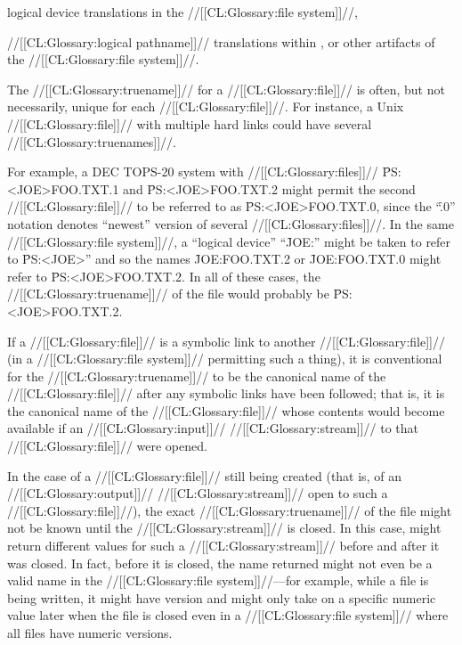      logical device translations in the //[[CL:Glossary:file system]]//,

     //[[CL:Glossary:logical pathname]]// translations within \clisp,
  or other artifacts of the //[[CL:Glossary:file system]]//.

The //[[CL:Glossary:truename]]// for a //[[CL:Glossary:file]]// is often, but not necessarily, unique for each //[[CL:Glossary:file]]//.  For instance, a Unix //[[CL:Glossary:file]]// with multiple hard links  could have several //[[CL:Glossary:truenames]]//.


For example, a DEC TOPS-20 system with //[[CL:Glossary:files]]// \f{PS:<JOE>FOO.TXT.1}  and \f{PS:<JOE>FOO.TXT.2} might permit the second //[[CL:Glossary:file]]// to be referred to as \f{PS:<JOE>FOO.TXT.0}, since the ``\f{.0}'' notation denotes ``newest'' version of several //[[CL:Glossary:files]]//. In the same //[[CL:Glossary:file system]]//, a ``logical device'' ``\f{JOE:}'' might be  taken to refer to \f{PS:<JOE>}'' and so the names \f{JOE:FOO.TXT.2} or \f{JOE:FOO.TXT.0} might refer to \f{PS:<JOE>FOO.TXT.2}. In all of these cases, the //[[CL:Glossary:truename]]// of the file would probably be \f{PS:<JOE>FOO.TXT.2}.

If a //[[CL:Glossary:file]]// is a symbolic link to another //[[CL:Glossary:file]]// (in a //[[CL:Glossary:file system]]// permitting such a thing), it is conventional for the //[[CL:Glossary:truename]]// to be the canonical name of the //[[CL:Glossary:file]]// after any symbolic links have been followed; that is, it is the canonical name of the //[[CL:Glossary:file]]// whose contents would become available if an //[[CL:Glossary:input]]// //[[CL:Glossary:stream]]// to that //[[CL:Glossary:file]]// were  opened.

In the case of a //[[CL:Glossary:file]]// still being created (that is, of an //[[CL:Glossary:output]]// //[[CL:Glossary:stream]]// open to such a //[[CL:Glossary:file]]//), the exact //[[CL:Glossary:truename]]// of the file might not be known until the //[[CL:Glossary:stream]]// is closed.  In this case,   might return different values for such a //[[CL:Glossary:stream]]// before and after it was closed.  In fact, before it is closed, the name returned might not even be a valid name in the //[[CL:Glossary:file system]]//---for example, while a file is being written, it might have version  and might only take on  a specific numeric value later when the file is closed even in a //[[CL:Glossary:file system]]// where all files have numeric versions.

\endsubsubsection%

\endsubsection%
